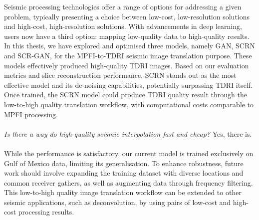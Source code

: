 Seismic processing technologies offer a range of options for addressing a given problem, typically presenting a choice between low-cost, low-resolution solutions and high-cost, high-resolution solutions. With advancements in deep learning, users now have a third option: mapping low-quality data to high-quality results. In this thesis, we have explored and optimised three models, namely GAN, SCRN and SCR-GAN, for the MPFI-to-TDRI seismic image translation purpose. These models effectively produced high-quality TDRI images. Based on our evaluation metrics and slice reconstruction performance, SCRN stands out as the most effective model and its de-noising capabilities, potentially surpassing TDRI itself. Once trained, the SCRN model could produce TDRI quality result through the low-to-high quality translation workflow, with computational costs comparable to MPFI processing. 
\\\\
\textit{Is there a way do high-quality seismic interpolation fast and cheap?} Yes, there is.
\\\\
While the performance is satisfactory, our current model is trained exclusively on Gulf of Mexico data, limiting its generalisation. To enhance robustness, future work should involve expanding the training dataset with diverse locations and common receiver gathers, as well as augmenting data through frequency filtering. This low-to-high quality image translation workflow can be extended to other seismic applications, such as deconvolution, by using pairs of low-cost and high-cost processing results.